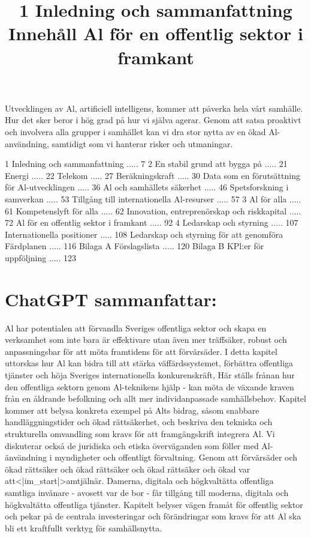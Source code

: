 \title{
1 Inledning och sammanfattning
}
Utvecklingen av Al, artificiell intelligens, kommer att påverka hela vårt samhälle. Hur det sker beror i hög grad på hur vi själva agerar. Genom att satsa proaktivt och involvera alla grupper i samhället kan vi dra stor nytta av en ökad Al-användning, samtidigt som vi hanterar risker och utmaningar.

\title{
Innehåll
}
1 Inledning och sammanfattning ..... 7
2 En stabil grund att bygga på ..... 21
Energi ..... 22
Telekom ..... 27
Beräkningskraft ..... 30
Data som en förutsättning för Al-utvecklingen ..... 36
Al och samhällets säkerhet ..... 46
Spetsforskning i samverkan ..... 53
Tillgång till internationella Al-resurser ..... 57
3 Al för alla ..... 61
Kompetenslyft för alla ..... 62
Innovation, entreprenörskap och riskkapital ..... 72
Al för en offentlig sektor i framkant ..... 92
4 Ledarskap och styrning ..... 107
Internationella positioner ..... 108
Ledarskap och styrning för att genomföra Färdplanen ..... 116
Bilaga A Förslagslista ..... 120
Bilaga B KPl:er för uppföljning ..... 123

\title{
Al för en offentlig sektor i framkant
}
\section*{ChatGPT sammanfattar:}
Al har potentialen att förvandla Sveriges offentliga sektor och skapa en verksamhet som inte bara är effektivare utan även mer träffsäker, robust och anpassningsbar för att möta framtidens för att förvärsäder.
I detta kapitel uttorskas hur Al kan bidra till att stärka väffärdssystemet, förbättra offentliga tjänster och höja Sveriges internationella konkurenskräft, Här ställs frånan hur den offentliga sektorn genom Al-teknikens hjälp - kan möta de växande kraven från en åldrande befolkning och allt mer individanpassade samhällsbehov. Kapitel kommer att belysa konkreta exempel på Alts bidrag, såsom snabbare handläggningstider och ökad rättsäkerhet, och beskriva den tekniska och strukturella omvandling som kravs för att framgängskrift integrera Al. Vi diskuterar också de juridiska och etiska överväganden som föller med Al-änvändning i myndigheter och offentligt förvaltning. Genom att förvärsäder och ökad rättsäker och ökad rättsäker och ökad rättsäker och ökad var att<|im_start|>amtjälnär. Damerna, digitala och högkvaltätta offentliga samtliga invånare - avosett var de bor - får tillgång till moderna, digitala och högkvaltätta offentliga tjänster. Kapitelt belyser vägen framåt för offentlig sektor och pekar på de centrala investeringar och förändringar som kravs för att Al ska bli ett kraftfullt verktyg för samhällsnytta.
